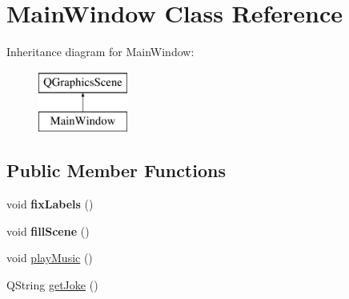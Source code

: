 \hypertarget{classMainWindow}{\section{Main\-Window Class Reference}
\label{classMainWindow}
}
Inheritance diagram for Main\-Window\-:\begin{figure}[H]
\begin{center}
\leavevmode
\includegraphics[height=2.000000cm]{classMainWindow}
\end{center}
\end{figure}
\subsection*{Public Member Functions}
\begin{DoxyCompactItemize}
\item 
\hypertarget{classMainWindow_abd384f3538e130501716ded5572c9aef}{void {\bfseries fix\-Labels} ()}\label{classMainWindow_abd384f3538e130501716ded5572c9aef}

\item 
\hypertarget{classMainWindow_ae48d838b0a15efdf4e4ab20edc7ebfcd}{void {\bfseries fill\-Scene} ()}\label{classMainWindow_ae48d838b0a15efdf4e4ab20edc7ebfcd}

\item 
void \hyperlink{classMainWindow_acf4e0d03d562158bfec204334f6de488}{play\-Music} ()
\item 
Q\-String \hyperlink{classMainWindow_a906793bdc362072fc3a5be28fdddfd40}{get\-Joke} ()
\end{DoxyCompactItemize}
